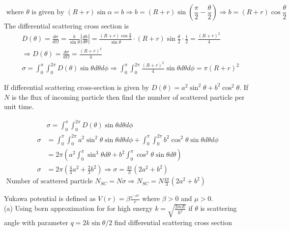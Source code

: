 \begin{enumerate}
\begin{answer}
			$$\text { where } \theta \text { is given by }(R+r) \sin \alpha=b \Rightarrow b=(R+r) \sin \left(\frac{\pi}{2}-\frac{\theta}{2}\right) \Rightarrow b=(R+r) \cos \frac{\theta}{2}$$
			The differential scattering cross section is
			\begin{align*}
			&D(\theta)=\frac{d \sigma}{d \Omega}=\frac{b}{\sin \theta}\left|\frac{d b}{d \theta}\right|=\frac{(R+r) \cos \frac{\theta}{2}}{\sin \theta} \cdot(R+r) \sin \frac{\theta}{2} \cdot \frac{1}{2}=\frac{(R+r)^{2}}{4} \\
			&\Rightarrow D(\theta)=\frac{d \sigma}{d \Omega}=\frac{(R+r)^{2}}{4}\\
			&\sigma=\int_{0}^{\pi} \int_{0}^{2 \pi} D(\theta) \sin \theta d \theta d \phi \Rightarrow \int_{0}^{\pi} \int_{0}^{2 \pi} \frac{(R+r)^{2}}{4} \sin \theta d \theta d \phi=\pi(R+r)^{2}
			\end{align*}	
	\end{answer}
	\begin{minipage}{\textwidth}
	\item If differential scattering cross-section is given by $D(\theta)=a^{2} \sin ^{2} \theta+b^{2} \cos ^{2} \theta$. If $N$ is the flux of incoming particle then find the number of scattered particle per unit time.
\end{minipage}
\begin{answer}
	\begin{align*}
	&\sigma=\int_{0}^{\pi} \int_{0}^{2 \pi} D(\theta) \sin \theta d \theta d \phi\\
		\sigma &=\int_{0}^{\pi} \int_{0}^{2 \pi} a^{2} \sin ^{2} \theta \sin \theta d \theta d \phi+\int_{0}^{\pi} \int_{0}^{2 \pi} b^{2} \cos ^{2} \theta \sin \theta d \theta d \phi \\
		&=2 \pi\left(a^{2} \int_{0}^{\pi} \sin ^{3} \theta d \theta+b^{2} \int_{0}^{\pi} \cos ^{2} \theta \sin \theta d \theta\right) \\
		\sigma &=2 \pi\left(\frac{4}{3} a^{2}+\frac{2}{3} b^{2}\right) \Rightarrow \sigma=\frac{4 \pi}{3}\left(2 a^{2}+b^{2}\right)
	\end{align*}
	$\text { Number of scattered particle } N_{S C}=N \sigma \Rightarrow N_{S C}=N \frac{4 \pi}{3}\left(2 a^{2}+b^{2}\right)$
\end{answer}
	\begin{minipage}{\textwidth}
	\item Yukawa potential is defined as $V(r)=\beta \frac{e^{-\mu r}}{r}$ where $\beta>0$ and $\mu>0$.\\
	(a) Using born approximation for for high energy $k=\sqrt{\frac{2 m E}{\hbar^{2}}}$ if $\theta$ is scattering angle with parameter $q=2 k \sin \theta / 2$ find differential scattering cross section\\

\end{minipage}
\end{enumerate}
